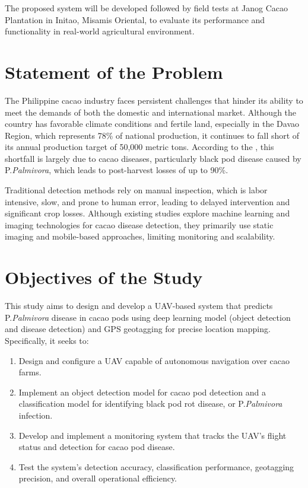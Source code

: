 {The proposed system will be developed followed by field tests at Janog Cacao Plantation in Initao, Misamis Oriental, to evaluate its performance and functionality in real-world agricultural environment.

\section{Statement of the Problem}

The Philippine cacao industry faces persistent challenges that hinder its ability to meet the demands of both the domestic and international market. Although the country has favorable climate conditions and fertile land, especially in the Davao Region, which represents 78\% of national production, it continues to fall short of its annual production target of 50,000 metric tons. According to the \cite{PhilCacaoRoadmap2021}, this shortfall is largely due to cacao diseases, particularly black pod disease caused by P.\textit{Palmivora}, which leads to post-harvest losses of up to 90\%.

Traditional detection methods rely on manual inspection, which is labor intensive, slow, and prone to human error, leading to delayed intervention and significant crop losses. Although existing studies explore machine learning and imaging technologies for cacao disease detection, they primarily use static imaging and mobile-based approaches, limiting monitoring and scalability.

\section{Objectives of the Study}

This study aims to design and develop a UAV-based system that predicts P.\textit{Palmivora} disease in cacao pods using deep learning model (object detection and disease detection) and GPS geotagging for precise location mapping. Specifically, it seeks to:

\begin{enumerate}
	\item Design and configure a UAV capable of autonomous navigation over cacao farms.
	\item Implement an object detection model for cacao pod detection and a classification model for identifying black pod rot disease, or P.\textit{Palmivora} infection.
	\item Develop and implement a monitoring system that tracks the UAV’s flight status and detection for cacao pod disease.
	\item Test the system’s detection accuracy, classification performance, geotagging precision, and overall operational efficiency.
\end{enumerate}

}
